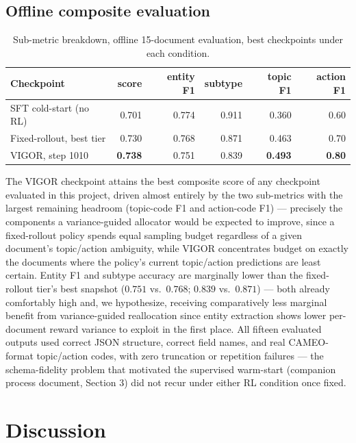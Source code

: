 \documentclass[11pt]{article}
\begin{document}
\subsection{Offline composite evaluation}

\begin{table}[h]
\centering
\caption{Sub-metric breakdown, offline 15-document evaluation, best checkpoints
under each condition.}
\label{tab:submetrics}
\begin{tabular}{@{}lrrrrr@{}}
\toprule
Checkpoint & score & entity F1 & subtype & topic F1 & action F1 \\
\midrule
SFT cold-start (no RL) & 0.701 & 0.774 & 0.911 & 0.360 & 0.60 \\
Fixed-rollout, best tier & 0.730 & 0.768 & 0.871 & 0.463 & 0.70 \\
VIGOR, step 1010 & \textbf{0.738} & 0.751 & 0.839 & \textbf{0.493} & \textbf{0.80} \\
\bottomrule
\end{tabular}
\end{table}

The VIGOR checkpoint attains the best composite score of any checkpoint evaluated
in this project, driven almost entirely by the two sub-metrics with the largest
remaining headroom (topic-code F1 and action-code F1) — precisely the components a
variance-guided allocator would be expected to improve, since a fixed-rollout
policy spends equal sampling budget regardless of a given document's topic/action
ambiguity, while VIGOR concentrates budget on exactly the documents where the
policy's current topic/action predictions are least certain. Entity F1 and subtype
accuracy are marginally lower than the fixed-rollout tier's best snapshot
($0.751$ vs.\ $0.768$; $0.839$ vs.\ $0.871$) — both already comfortably high and,
we hypothesize, receiving comparatively less marginal benefit from variance-guided
reallocation since entity extraction shows lower per-document reward variance to
exploit in the first place. All fifteen evaluated outputs used correct JSON
structure, correct field names, and real CAMEO-format topic/action codes, with
zero truncation or repetition failures — the schema-fidelity problem that
motivated the supervised warm-start (companion process document, Section 3) did
not recur under either RL condition once fixed.

\section{Discussion}
\label{sec:discussion}
\end{document}
